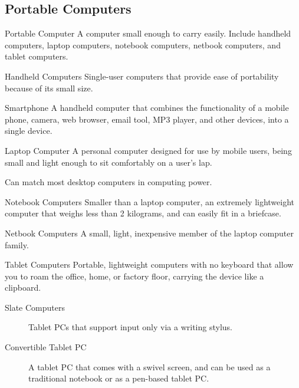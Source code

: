 \documentclass[\main/notes.tex]{subfiles}
\begin{document}
			\subsection{Portable Computers}
				\begin{definition}{Portable Computer}
					A computer small enough to carry easily. Include handheld computers, laptop computers, notebook computers, netbook computers, and tablet computers.
				\end{definition}
				\begin{definition}{Handheld Computers}
					Single-user computers that provide ease of portability because of its small size.
				\end{definition}
				\begin{definition}{Smartphone}
					A handheld computer that combines the functionality of a mobile phone, camera, web browser, email tool, MP3 player, and other devices, into a single device.
				\end{definition}
				\begin{definition}{Laptop Computer}
					A personal computer designed for use by mobile users, being small and light enough to sit comfortably on a user's lap.

					Can match most desktop computers in computing power.
				\end{definition}
				\begin{definition}{Notebook Computers}
					Smaller than a laptop computer, an extremely lightweight computer that weighs less than 2 kilograms, and can easily fit in a briefcase.
				\end{definition}
				\begin{definition}{Netbook Computers}
					A small, light, inexpensive member of the laptop computer family.
				\end{definition}
				\begin{definition}{Tablet Computers}
					Portable, lightweight computers with no keyboard that allow you to roam the office, home, or factory floor, carrying the device like a clipboard.
					\begin{description}
						\item[Slate Computers] Tablet PCs that support input only via a writing stylus.
						\item[Convertible Tablet PC] A tablet PC that comes with a swivel screen, and can be used as a traditional notebook or as a pen-based tablet PC. 
					\end{description}
				\end{definition}
\end{document}
